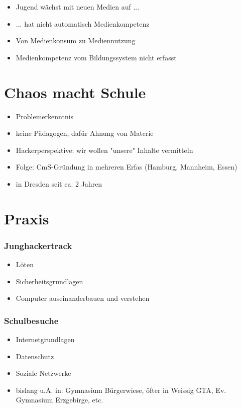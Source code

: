 \documentclass[12pt]{beamer}
\begin{document}
\begin{frame}
  \begin{itemize}
    \item Jugend wächst mit neuen Medien auf ...
    \item ... hat nicht automatisch Medienkompetenz
    \item Von Medienkonsum zu Mediennutzung
    \item Medienkompetenz vom Bildungssystem nicht erfasst
  \end{itemize}
\end{frame}

\section{Chaos macht Schule}

\begin{frame}
  \begin{itemize}
    \item Problemerkenntnis
    \item keine Pädagogen, dafür Ahnung von Materie
    \item Hackerperspektive: wir wollen "unsere" Inhalte vermitteln
    \item Folge: CmS-Gründung in mehreren Erfas (Hamburg, Mannheim, Essen)
    \item in Dresden seit ca. 2 Jahren
  \end{itemize}
\end{frame}

\section{Praxis}

\begin{frame}
  \frametitle{Junghackertrack}
  \begin{itemize}
    \item Löten
    \item Sicherheitsgrundlagen
    \item Computer auseinanderbauen und verstehen
  \end{itemize}
\end{frame}

\begin{frame}
  \frametitle{Schulbesuche}
  \begin{itemize}
    \item Internetgrundlagen
    \item Datenschutz
    \item Soziale Netzwerke
    \item bislang u.A. in: Gymnasium Bürgerwiese, öfter in Weissig GTA, Ev. Gymnasium Erzgebirge, etc.
  \end{itemize}
\end{frame}
\end{document}
